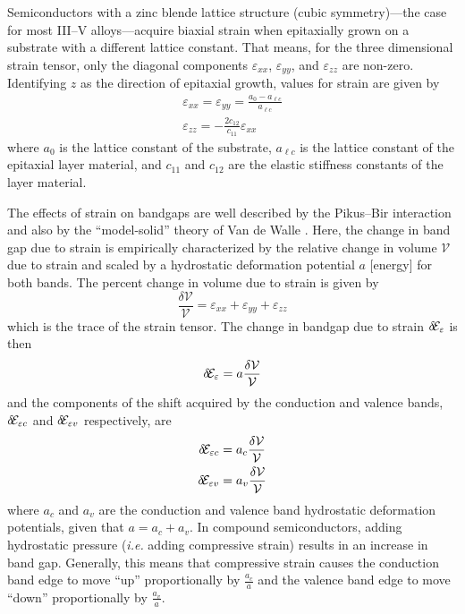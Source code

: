 \documentclass[12pt]{report}
\begin{document}
{Semiconductors with a zinc blende lattice structure (cubic symmetry)---the case for most III--V alloys---acquire biaxial strain when epitaxially grown on a substrate with a different lattice constant.  That means, for the three dimensional strain tensor, only the diagonal components $\varepsilon_{xx}$, $\varepsilon_{yy}$, and $\varepsilon_{zz}$ are non-zero.  Identifying $z$ as the direction of epitaxial growth, values for strain are given by \cite{Chuang}
\begin{subequations}
\begin{gather}
\varepsilon_{xx} = \varepsilon_{yy} = \frac{a_0 - a_{\ell c}}{a_{\ell c}}\\
\varepsilon_{zz} = -\frac{2 c_{12}}{c_{11}} \varepsilon_{xx}
\end{gather}
\end{subequations}
where $a_0$ is the lattice constant of the substrate, $a_{\ell c}$ is the lattice constant of the epitaxial layer material, and $c_{11}$ and $c_{12}$ are the elastic stiffness constants of the layer material.

The effects of strain on bandgaps are well described by the Pikus--Bir interaction \cite{Pikus-Bir} and also by the ``model-solid'' theory of Van de Walle \cite{VandeWalle:PRB:1989}.  Here, the change in band gap due to strain is empirically characterized by the relative change in volume $\mathcal{V}$ due to strain and scaled by a hydrostatic deformation potential $a$ [{\footnotesize{energy}}] for both bands.  The percent change in volume due to strain is given by
\begin{equation}
\frac{\delta \mathcal{V}}{\mathcal{V}} = \varepsilon_{xx}+\varepsilon_{yy}+\varepsilon_{zz}
\end{equation}
which is the trace of the strain tensor.  The change in bandgap due to strain $\delta\!\EE_\varepsilon$ is then
\begin{equation}
\delta\!\EE_\varepsilon = a \frac{\delta \mathcal{V}}{\mathcal{V}}
\end{equation}
and the components of the shift acquired by the conduction and valence bands, $\delta\!\EE_{\varepsilon c}$ and $\delta\!\EE_{\varepsilon v}$ respectively, are
\begin{subequations}
\begin{gather}
\delta\!\EE_{\varepsilon c} = a_c \frac{\delta \mathcal{V}}{\mathcal{V}}\\
\delta\!\EE_{\varepsilon v} = a_v \frac{\delta \mathcal{V}}{\mathcal{V}}
\end{gather}
\end{subequations}
where $a_c$ and $a_v$ are the conduction and valence band hydrostatic deformation potentials, given that $a=a_c+a_v$.  In compound semiconductors, adding hydrostatic pressure (\emph{i.e.} adding compressive strain) results in an increase in band gap.  Generally, this means that compressive strain causes the conduction band edge to move ``up'' proportionally by $\frac{a_c}{a}$ and the valence band edge to move ``down'' proportionally by $\frac{a_v}{a}$.

}
\end{document}
